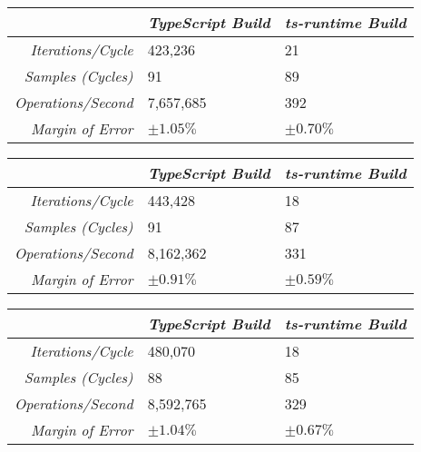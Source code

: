 \begin{center}
{
\centering
\tabulinesep=1.2mm
\setlength{\tabcolsep}{5mm}
\def\arraystretch{1.25}
\small
\begin{tabu} to \textwidth {|r||X[c,m]|X[c,m]|}
  \hline
  & \emph{TypeScript Build} & \emph{ts-runtime Build} \\
  \hline
  \hline
  \emph{Iterations/Cycle}  & 423,236 & 21 \\
  \hline
  \emph{Samples (Cycles)}  & 91 & 89 \\
  \hline
  \emph{Operations/Second} & 7,657,685 & 392 \\
  \hline
  \emph{Margin of Error}   & $\pm 1.05\%$ & $\pm 0.70\%$ \\
  \hline
\end{tabu}
}
\end{center}

\begin{center}
{
\centering
\tabulinesep=1.2mm
\setlength{\tabcolsep}{5mm}
\def\arraystretch{1.25}
\small
\begin{tabu} to \textwidth {|r||X[c,m]|X[c,m]|}
  \hline
  & \emph{TypeScript Build} & \emph{ts-runtime Build} \\
  \hline
  \hline
  \emph{Iterations/Cycle}  & 443,428 & 18 \\
  \hline
  \emph{Samples (Cycles)}  & 91 & 87 \\
  \hline
  \emph{Operations/Second} & 8,162,362 & 331 \\
  \hline
  \emph{Margin of Error}   & $\pm 0.91\%$ & $\pm 0.59\%$ \\
  \hline
\end{tabu}
}
\end{center}

\begin{center}
{
\centering
\tabulinesep=1.2mm
\setlength{\tabcolsep}{5mm}
\def\arraystretch{1.25}
\small
\begin{tabu} to \textwidth {|r||X[c,m]|X[c,m]|}
  \hline
  & \emph{TypeScript Build} & \emph{ts-runtime Build} \\
  \hline
  \hline
  \emph{Iterations/Cycle}  & 480,070 & 18 \\
  \hline
  \emph{Samples (Cycles)}  & 88 & 85 \\
  \hline
  \emph{Operations/Second} & 8,592,765 & 329 \\
  \hline
  \emph{Margin of Error}   & $\pm 1.04\%$ & $\pm 0.67\%$ \\
  \hline
\end{tabu}
}
\end{center}

